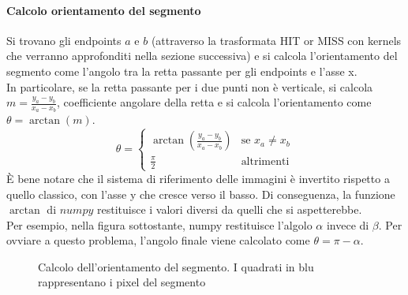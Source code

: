 \paragraph{Calcolo orientamento del segmento}
Si trovano gli endpoints $a$ e $b$ (attraverso la trasformata HIT or MISS con kernels che verranno approfonditi nella sezione successiva) e si calcola l'orientamento del segmento come l'angolo tra la retta passante per gli endpoints e l'asse x.\\
In particolare, se la retta passante per i due punti non è verticale, si calcola $m = \frac{y_a - y_b}{x_a-x_b}$, coefficiente angolare della retta e si calcola l'orientamento come $\theta = \arctan(m)$.
\begin{equation}
  \theta = \begin{cases}
    \arctan( \frac{y_a - y_b}{x_a-x_b}) & \text{se } x_a \neq x_b \\
    \frac{\pi}{2}                       & \text{altrimenti}
  \end{cases}
\end{equation}
È bene notare che il sistema di riferimento delle immagini è invertito rispetto a quello classico, con l'asse y che cresce verso il basso. Di conseguenza, la funzione $\arctan$ di $numpy$ restituisce i valori diversi da quelli che si aspetterebbe. \\
Per esempio, nella figura sottostante, numpy restituisce l'algolo $\alpha$ invece di $\beta$. Per ovviare a questo problema, l'angolo finale viene calcolato come $\theta = \pi - \alpha$.
\begin{figure}[H]
  \centering
  \caption {Calcolo dell'orientamento del segmento. I quadrati in blu rappresentano i pixel del segmento}
\end{figure}
